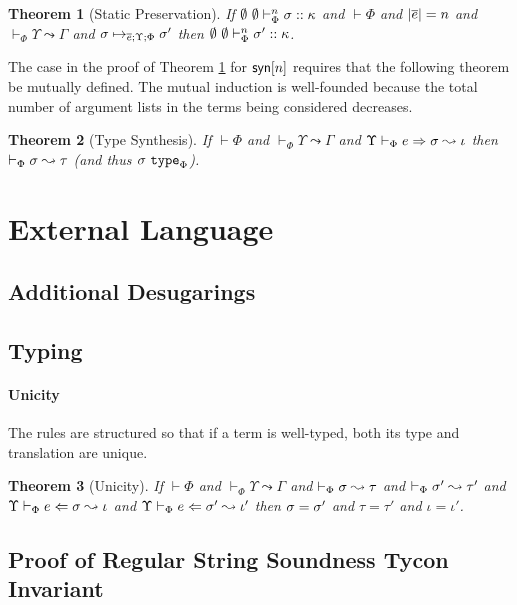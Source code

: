 \documentclass[12pt]{article}
\newtheorem{theorem}{Theorem}
\begin{document}
\begin{theorem}[Static Preservation]\label{thm:static-preservation}
If $\emptyset~\emptyset \vdash_{\Phi}^{n} \sigma :: \kappa$ and $\vdash \Phi$ and $|\overline{e}|=n$ and $\vdash_\Phi \Upsilon \leadsto \Gamma$ and $\sigma \mapsto_{\overline{e}; \Upsilon; \Phi} \sigma'$ then $\emptyset~\emptyset \vdash_{\Phi}^{n} \sigma' :: \kappa$.
\end{theorem}
The case in the proof of Theorem \ref{thm:static-preservation} for ${\sf syn}[n]$ requires that the following theorem be mutually defined. The mutual induction is well-founded because the total number of argument lists in the terms being considered decreases.
\begin{theorem}[Type Synthesis]
If $\vdash \Phi$ and $\vdash_\Phi \Upsilon \leadsto \Gamma$ and $\Upsilon \vdash_{\Phi} e \Rightarrow \sigma \leadsto \iota$ then $\vdash_\Phi \sigma \leadsto \tau$ (and thus $\sigma~\texttt{type}_{\Phi}$). 
\end{theorem}

\section{External Language}
\subsection{Additional Desugarings}
\subsection{Typing}
\paragraph{Unicity}
The rules are structured so that if a term is well-typed, both its type and translation are unique.
\begin{theorem}[Unicity]
If $\vdash \Phi$ and $\vdash_\Phi \Upsilon \leadsto \Gamma$ and $\vdash_\Phi \sigma \leadsto \tau$ and $\vdash_\Phi \sigma' \leadsto \tau'$ and $\Upsilon \vdash_{\Phi} e \Leftarrow \sigma \leadsto \iota$ and $\Upsilon \vdash_{\Phi} e \Leftarrow \sigma' \leadsto \iota'$ then $\sigma = \sigma'$ and $\tau=\tau'$ and $\iota = \iota'$.
\end{theorem}


\subsection{Proof of Regular String Soundness Tycon Invariant}


\newpage
\end{document}
